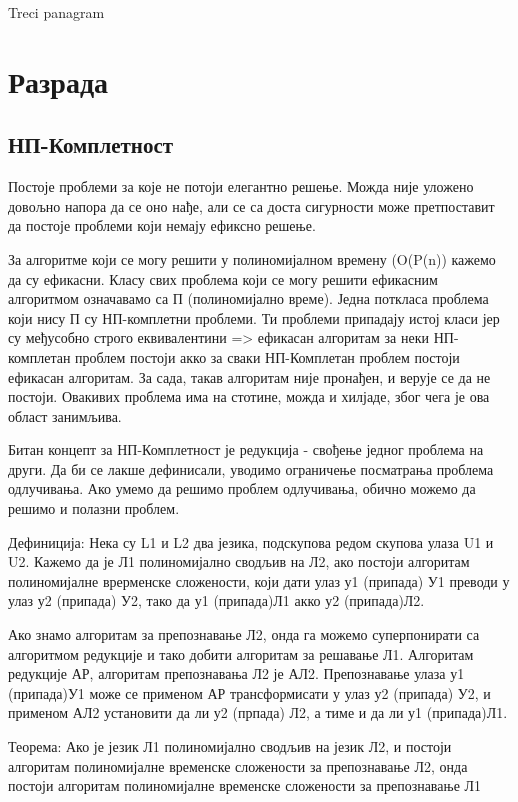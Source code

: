 \documentclass[12pt,oneside]{memoir}
\begin{document}
Treci panagram

\chapter{Разрада}

\section{НП-Комплетност}

Постоје проблеми за које не потоји елегантно решење. Можда није уложено довољно напора да се оно нађе, али се са доста сигурности може претпоставит
да постоје проблеми који немају ефиксно решење. 

За алгоритме који се могу решити у полиномијалном времену (O(P(n)) кажемо да су ефикасни. Класу свих проблема који се могу решити ефикасним алгоритмом
означавамо са П (полиномијално време). 
Једна поткласа проблема који нису П су НП-комплетни проблеми. Ти проблеми припадају истој класи јер су међусобно строго еквивалентини => ефикасан 
алгоритам за неки НП-комплетан проблем постоји акко за сваки НП-Комплетан проблем постоји ефикасан алгоритам.  За сада, такав алгоритам није пронађен, и
верује се да не постоји. Овакивих проблема има на стотине, можда и хилјаде, због чега је ова област занимљива.

Битан концепт за НП-Комплетност је редукција - свођење једног проблема на други. Да би се лакше дефинисали, уводимо ограничење посматрања проблема одлучивања. Ако умемо да решимо проблем одлучивања, обично можемо да решимо и полазни проблем.

Дефиниција: Нека су L1 и L2 два језика, подскупова редом скупова улаза U1 и U2. Кажемо да је Л1 полиномијално сводљив на Л2, ако постоји алгоритам полиномијалне врерменске сложености, који дати улаз у1 (припада) У1 преводи у улаз у2 (припада) У2, тако да у1 (припада)Л1 акко у2 (припада)Л2.

Ако знамо алгоритам за препознавање Л2, онда га можемо суперпонирати са алгоритмом редукције и тако добити алгоритам за решавање Л1. Алгоритам редукције
АР, алгоритам препознавања Л2 је АЛ2. Препознавање улаза у1 (припада)У1 може се применом АР трансформисати у улаз у2 (припада) У2, и применом АЛ2 установити да ли у2 (прпада) Л2, а тиме и да ли у1 (припада)Л1. 

Теорема: Ако је језик Л1 полиномијално сводљив на језик Л2, и постоји алгоритам полиномијалне временске сложености за препознавање Л2, онда постоји алгоритам полиномијалне временске сложености за препознавање Л1
\end{document}
